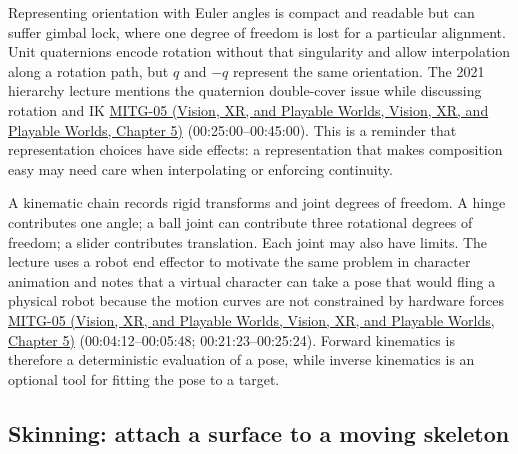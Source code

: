 Representing orientation with Euler angles is compact and readable but can suffer gimbal lock, where one degree of freedom is lost for a particular alignment. Unit quaternions encode rotation without that singularity and allow interpolation along a rotation path, but \(q\) and \(-q\) represent the same orientation. The 2021 hierarchy lecture mentions the quaternion double-cover issue while discussing rotation and IK \href{../07-Vision-XR-and-Playable-Worlds/main.pdf\#nameddest=04-visual-computing-ii-ch036-mitg-05---hierarchical-modeling}{MITG-05 (Vision, XR, and Playable Worlds, Vision, XR, and Playable Worlds, Chapter 5)} (00:25:00--00:45:00). This is a reminder that representation choices have side effects: a representation that makes composition easy may need care when interpolating or enforcing continuity.

A kinematic chain records rigid transforms and joint degrees of freedom. A hinge contributes one angle; a ball joint can contribute three rotational degrees of freedom; a slider contributes translation. Each joint may also have limits. The lecture uses a robot end effector to motivate the same problem in character animation and notes that a virtual character can take a pose that would fling a physical robot because the motion curves are not constrained by hardware forces \href{../07-Vision-XR-and-Playable-Worlds/main.pdf\#nameddest=04-visual-computing-ii-ch036-mitg-05---hierarchical-modeling}{MITG-05 (Vision, XR, and Playable Worlds, Vision, XR, and Playable Worlds, Chapter 5)} (00:04:12--00:05:48; 00:21:23--00:25:24). Forward kinematics is therefore a deterministic evaluation of a pose, while inverse kinematics is an optional tool for fitting the pose to a target.

\subsection{Skinning: attach a surface to a moving skeleton}\label{04-visual-computing-ii-ch029-skinning-attach-a-surface-to-a-moving-skeleton}

